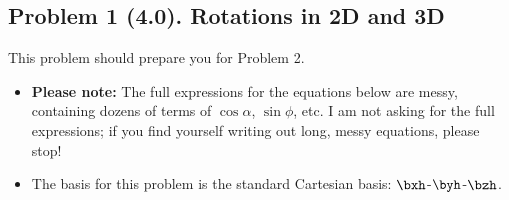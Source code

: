 \documentclass[11pt,titlepage,fleqn]{article}
\newcommand{\rotangA}{\alpha}
\begin{document}

\pagebreak
\subsection*{Problem 1 (4.0). Rotations in 2D and 3D}

This problem should prepare you for Problem 2.
%
\begin{itemize}
\item {\bf Please note:} The full expressions for the equations below are messy, containing dozens of terms of $\cos\rotangA$, $\sin\phi$, etc. I am not asking for the full expressions; if you find yourself writing out long, messy equations, please stop!
\item The basis for this problem is the standard Cartesian basis: $\bxh$-$\byh$-$\bzh$.
\end{itemize}

\end{document}
